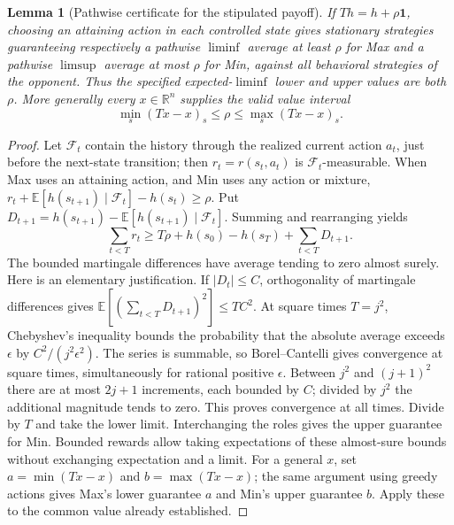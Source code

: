 \documentclass[11pt]{article}
\newtheorem{lemma}[theorem]{Lemma}
\theoremstyle{definition}
\newcommand{\R}{\mathbb R}
\begin{document}
\begin{lemma}[Pathwise certificate for the stipulated payoff]
If $Th=h+\rho\mathbf1$, choosing an attaining action in each controlled
state gives stationary strategies guaranteeing respectively a pathwise
$\liminf$ average at least $\rho$ for Max and a pathwise $\limsup$ average
at most $\rho$ for Min, against all behavioral strategies of the opponent.
Thus the specified expected-$\liminf$ lower and upper values are both $\rho$.
More generally every $x\in\R^n$ supplies the valid value interval
\[
 \min_s(Tx-x)_s\leq\rho\leq\max_s(Tx-x)_s.
\]
\end{lemma}
\begin{proof}
Let $\mathcal F_t$ contain the history through the realized current action
$a_t$, just before the next-state transition; then $r_t=r(s_t,a_t)$ is
$\mathcal F_t$-measurable. When Max uses an attaining action, and Min uses any
action or mixture,
$r_t+\mathbb E[h(s_{t+1})\mid\mathcal F_t]-h(s_t)\geq\rho$.
Put $D_{t+1}=h(s_{t+1})-\mathbb E[h(s_{t+1})\mid\mathcal F_t]$.
Summing and rearranging yields
\[
 \sum_{t<T}r_t\geq T\rho+h(s_0)-h(s_T)+\sum_{t<T}D_{t+1}.
\]
The bounded martingale differences have average tending to zero almost surely.
Here is an elementary justification. If $|D_t|\leq C$, orthogonality of
martingale differences gives $\mathbb E[(\sum_{t<T}D_{t+1})^2]\leq TC^2$.
At square times $T=j^2$, Chebyshev's inequality bounds the probability that
the absolute average exceeds $\epsilon$ by $C^2/(j^2\epsilon^2)$.
The series is summable, so Borel--Cantelli gives convergence at square times,
simultaneously for rational positive $\epsilon$. Between $j^2$ and $(j+1)^2$
there are at most $2j+1$ increments, each bounded by $C$; divided by $j^2$
the additional magnitude tends to zero. This proves convergence at all times.
Divide by $T$ and take the lower limit. Interchanging the roles gives the
upper guarantee for Min. Bounded rewards allow taking expectations of these
almost-sure bounds without exchanging expectation and a limit.
For a general $x$, set $a=\min(Tx-x)$ and $b=\max(Tx-x)$; the same argument
using greedy actions gives Max's lower guarantee $a$ and Min's upper guarantee
$b$. Apply these to the common value already established.
\end{proof}
\end{document}
